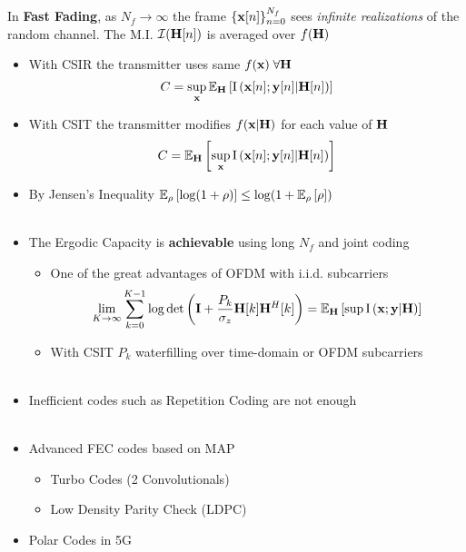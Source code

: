 \documentclass[xcolor=dvipsnames,aspectratio=169]{beamer}
\begin{document}
{\begin{definition}
In \textbf{Fast Fading}, as $N_f\to\infty$ the frame $\{\mathbf{x}[n]\}_{n=0}^{N_f}$ sees \textit{infinite realizations} of the random channel. The M.I. $\mathcal{I}(\mathbf{H}[n])$ is averaged over $f(\mathbf{H})$
\begin{itemize}
     \item With CSIR the transmitter uses same $f(\mathbf{x})\; \forall \mathbf{H}$
        $$C=\sup_{\mathbf{x}}{\mathbb{E}_{\mathbf{H}}\left[ {\textnormal{I}\left(\mathbf{x}[n];\mathbf{y}[n]|\mathbf{H}[n]\right)}\right]}$$
     \item With CSIT the transmitter modifies $f(\mathbf{x}|\mathbf{H})$ for each value of $\mathbf{H}$
        $$C={\mathbb{E}_{\mathbf{H}}\left[ \sup_{\mathbf{x}} {\textnormal{I}\left(\mathbf{x}[n];\mathbf{y}[n]|\mathbf{H}[n]\right)}\right]}$$
    \end{itemize}
\end{definition}
\begin{itemize}
 \item By Jensen's Inequality ${\mathbb{E}_{\rho}\left[\log(1+\rho)\right]}\leq\log(1+{\mathbb{E}_{\rho}\left[\rho\right]})$\\ \ \\
 \item The Ergodic Capacity is \textbf{achievable} using long $N_f$ and joint coding
 \begin{itemize}
    \item One of the great advantages of OFDM with i.i.d. subcarriers
        $$\lim_{K\to\infty} \sum_{k=0}^{K-1}\log\det\left(\mathbf{I}+\frac{P_k}{\sigma_z}\mathbf{H}[k]\mathbf{H}^H[k]\right)={\mathbb{E}_{\mathbf{H}}\left[\sup {\textnormal{I}\left(\mathbf{x};\mathbf{y}|\mathbf{H}\right)}\right]}$$
    \item With CSIT $P_k$ waterfilling over time-domain or OFDM subcarriers\\ \ \\
 \end{itemize}
 \item Inefficient codes such as Repetition Coding are not enough\\ \ \\
 \item Advanced FEC codes based on MAP
 \begin{itemize}
    \item Turbo Codes (2 Convolutionals)
    \item Low Density Parity Check (LDPC)
 \end{itemize}
 \item Polar Codes in 5G
\end{itemize}
\pagebreak

}
\end{document}
